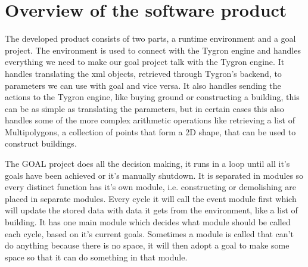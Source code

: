 \section{Overview of the software product}
The developed product consists of two parts, a runtime environment and a goal project.
The environment is used to connect with the Tygron engine and handles everything we need to make our goal project talk with the Tygron engine.
It handles translating the xml objects, retrieved through Tygron's backend, to parameters we can use with goal and vice versa.
It also handles sending the actions to the Tygron engine, like buying ground or constructing a building, this can be as simple as translating the parameters, but in certain cases this also handles some of the more complex arithmetic operations like retrieving a list of Multipolygons, a collection of points that form a 2D shape, that can be used to construct buildings.

The GOAL project does all the decision making, it runs in a loop until all it's goals have been achieved or it's manually shutdown.
It is separated in modules so every distinct function has it's own module, i.e. constructing or demolishing are placed in separate modules.
Every cycle it will call the event module first which will update the stored data with data it gets from the environment, like a list of building.
It has one main module which decides what module should be called each cycle, based on it's current goals.
Sometimes a module is called that can't do anything because there is no space, it will then adopt a goal to make some space so that it can do something in that module.